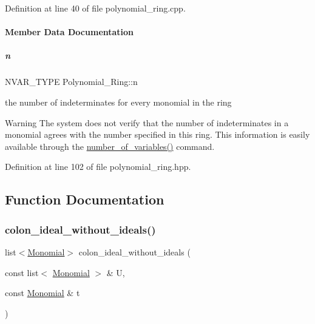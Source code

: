 Definition at line 40 of file polynomial\+\_\+ring.\+cpp.



\paragraph{Member Data Documentation}
\mbox{\label{group__polygroup_abf753b41b3e84bd8e32de314f15f7826}} 
\subparagraph{\texorpdfstring{n}{n}}
{\footnotesize\ttfamily N\+V\+A\+R\+\_\+\+T\+Y\+PE Polynomial\+\_\+\+Ring\+::n\hspace{0.3cm}{\ttfamily [protected]}}



the number of indeterminates for every monomial in the ring 

\begin{DoxyWarning}{Warning}
The system does not verify that the number of indeterminates in a monomial agrees with the number specified in this ring. This information is easily available through the \hyperlink{group__polygroup_a79e7dd821659e9d4b6862487963f7352}{number\+\_\+of\+\_\+variables()} command. 
\end{DoxyWarning}


Definition at line 102 of file polynomial\+\_\+ring.\+hpp.



\subsection{Function Documentation}
\mbox{\label{group__polygroup_gaf4655e829836ead5fe2ce766fb0cebbc}} 
\subsubsection{\texorpdfstring{colon\+\_\+ideal\+\_\+without\+\_\+ideals()}{colon\_ideal\_without\_ideals()}}
{\footnotesize\ttfamily list$<$\hyperlink{group__polygroup_class_monomial}{Monomial}$>$ colon\+\_\+ideal\+\_\+without\+\_\+ideals (\begin{DoxyParamCaption}\item[{const list$<$ \hyperlink{group__polygroup_class_monomial}{Monomial} $>$ \&}]{U,  }\item[{const \hyperlink{group__polygroup_class_monomial}{Monomial} \&}]{t }\end{DoxyParamCaption})}



